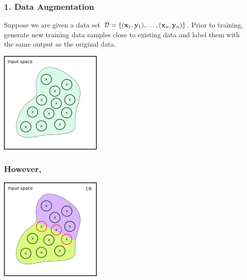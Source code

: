 \documentclass[aspectratio=169]{beamer}
\begin{document}
\begin{frame}[fragile]
  \frametitle{1. Data Augmentation}
  Suppose we are given a data set $\mathcal{D} =  \{(\mathbf{x}_1, \mathbf{y}_1), \ldots , (\mathbf{x}_n, \mathbf{y}_n)\}$.
  Prior to training, generate new training data samples close to existing data and label them with the same output as the original data.
      {\scriptsize
 \begin{thebibliography}{99}
   \beamertemplatearticlebibitems
\end{thebibliography}}


\begin{center}

  \includegraphics[width=5cm]{Images/SR-vs-CR-2.png}

  \end{center}

\end{frame}




\begin{frame}[fragile]
  \frametitle{However,}


\begin{center}

  \includegraphics[width=5cm]{Images/SR-vs-CR-4.png}

  \end{center}

\end{frame}
\end{document}
